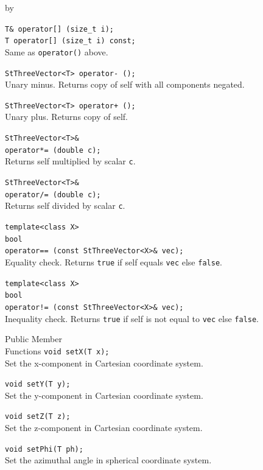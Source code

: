 \documentclass[twoside]{article}
\newcommand{\comp}[1]{\texttt{#1}}%
\newcommand{\entrylabel}[1]{\mbox{\textbf{{#1}}}\hfil}%
\newenvironment{entry}
{\begin{list}{}%
    {\renewcommand{\makelabel}{\entrylabel}%
     \setlength{\labelwidth}{90pt}%
     \setlength{\leftmargin}{\labelwidth}
     \advance\leftmargin by \labelsep%
      }%
    }%
  {\end{list}}
\newcommand{\Entrylabel}[1]%
{\raisebox{0pt}[1ex][0pt]{\makebox[\labelwidth][l]%
    {\parbox[t]{\labelwidth}{\hspace{0pt}\textbf{{#1}}}}}}
\newenvironment{Entry}%
{\renewcommand{\entrylabel}{\Entrylabel}\begin{entry}}%
  {\end{entry}}
\begin{document}
\begin{Entry}
    \verb+T& operator[] (size_t i);+\\
    \verb+T operator[] (size_t i) const;+\\
    Same as \comp{operator()} above.

    \verb+StThreeVector<T> operator- ();+\\
    Unary minus. Returns copy of self with all components negated.
    
    \verb#StThreeVector<T> operator+ ();#\\
    Unary plus. Returns copy of self.
    
    \verb+StThreeVector<T>&+\\
    \verb+operator*= (double c);+\\
    Returns self multiplied by scalar \comp{c}.
    
    \verb+StThreeVector<T>&+\\
    \verb+operator/= (double c);+\\
    Returns self divided by scalar \comp{c}.
    
    \verb+template<class X>+\\
    \verb+bool+\\
    \verb+operator== (const StThreeVector<X>& vec);+\\
    Equality check. Returns \comp{true} if self equals
    \comp{vec} else \comp{false}.
    
    \verb+template<class X>+\\
    \verb+bool+\\
    \verb+operator!= (const StThreeVector<X>& vec);+\\
    Inequality check. Returns \comp{true} if self is not equal to
    \comp{vec} else \comp{false}.
    

\item[Public Member\\ Functions]
    \verb+void setX(T x);+\\
    Set the x-component in Cartesian coordinate system.
    
    \verb+void setY(T y);+\\
    Set the y-component in Cartesian coordinate system.
    
    \verb+void setZ(T z);+\\
    Set the z-component in Cartesian coordinate system.

    \verb+void setPhi(T ph);+\\
    Set the azimuthal angle in spherical coordinate system.


\end{Entry}
\end{document}
